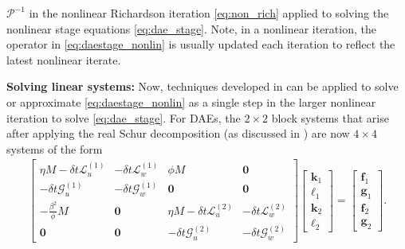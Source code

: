 \documentclass[review]{siamart}
\begin{document}
$\mathcal{P}^{-1}$ in the nonlinear Richardson iteration \eqref{eq:non_rich}
applied to solving the nonlinear stage equations \eqref{eq:dae_stage}. Note,
in a nonlinear iteration, the operator in \eqref{eq:daestage_nonlin} is
usually updated each iteration to reflect the latest nonlinear iterate.


\textbf{Solving linear systems:}
Now, techniques developed in  can be applied to solve
or approximate \eqref{eq:daestage_nonlin} as a single step in the larger
nonlinear iteration to solve \eqref{eq:dae_stage}. For DAEs, the $2\times 2$
block systems that arise after applying the real Schur decomposition (as
discussed in ) are now $4\times 4$ systems of
the form
%
\begin{align}\label{eq:dae_block}
\begin{bmatrix} \eta M - \delta t\mathcal{L}_{u}^{(1)} & -\delta t\mathcal{L}_{w}^{(1)}
		& \phi M & \mathbf{0} \\
	-\delta t\mathcal{G}_{u}^{(1)} & -\delta t\mathcal{G}_w^{(1)}
		& \mathbf{0} & \mathbf{0} \\
	-\tfrac{\beta^2}{\phi}M & \mathbf{0} & \eta M - \delta t\mathcal{L}_{u}^{(2)} &
		-\delta t\mathcal{L}_{w}^{(2)} \\
	\mathbf{0} & \mathbf{0} & -\delta t\mathcal{G}_{u}^{(2)} &
		-\delta t\mathcal{G}_w^{(2)} \end{bmatrix}
	\begin{bmatrix} \mathbf{k}_1 \\ \boldsymbol{\ell}_1 \\
		 \mathbf{k}_2 \\ \boldsymbol{\ell}_2 \end{bmatrix}
	= 	\begin{bmatrix} \mathbf{f}_1 \\ \mathbf{g}_1 \\
		 \mathbf{f}_2 \\ \mathbf{g}_2 \end{bmatrix}.
\end{align}
\end{document}
